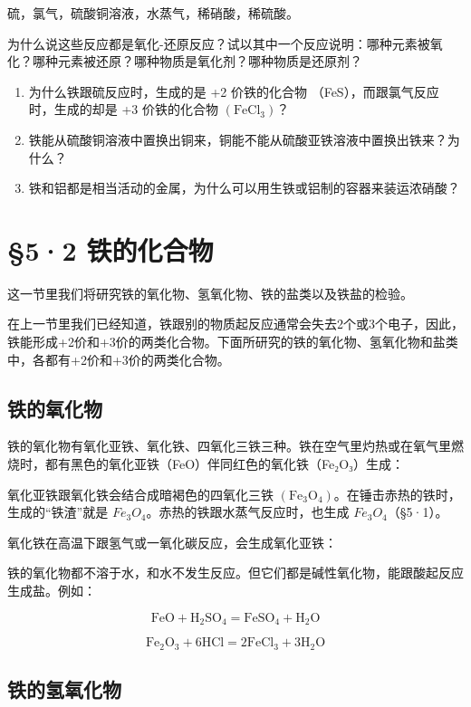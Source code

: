 硫，氯气，硫酸铜溶液，水蒸气，稀硝酸，稀硫酸。

为什么说这些反应都是氧化-还原反应？试以其中一个反应说明：哪种元素被氧化？哪种元素被还原？哪种物质是氧化剂？哪种物质是还原剂？

\begin{enumerate}[start=2]
\item
  为什么铁跟硫反应时，生成的是 +2 价铁的化合物
  （FeS），而跟氯气反应时，生成的却是 +3 价铁的化合物
  \((\mathrm{FeCl}_{3})\)？
\item
  铁能从硫酸铜溶液中置换出铜来，铜能不能从硫酸亚铁溶液中置换出铁来？为什么？
\item
  铁和铝都是相当活动的金属，为什么可以用生铁或铝制的容器来装运浓硝酸？
\end{enumerate}

\section{§5·2 铁的化合物}

这一节里我们将研究铁的氧化物、氢氧化物、铁的盐类以及铁盐的检验。

在上一节里我们已经知道，铁跟别的物质起反应通常会失去2个或3个电子，因此，铁能形成+2价和+3价的两类化合物。下面所研究的铁的氧化物、氢氧化物和盐类中，各都有+2价和+3价的两类化合物。

\subsection{铁的氧化物}

铁的氧化物有氧化亚铁、氧化铁、四氧化三铁三种。铁在空气里灼热或在氧气里燃烧时，都有黑色的氧化亚铁（FeO）伴同红色的氧化铁（Fe₂O₃）生成：

氧化亚铁跟氧化铁会结合成暗褐色的四氧化三铁
\(\left(\mathrm{Fe}_{3}\mathrm{O}_{4}\right)\)。在锤击赤热的铁时，生成的``铁渣''就是
\(Fe_{3}O_{4}\)。赤热的铁跟水蒸气反应时，也生成
\(Fe_{3}O_{4}\)（§5·1）。

氧化铁在高温下跟氢气或一氧化碳反应，会生成氧化亚铁：

铁的氧化物都不溶于水，和水不发生反应。但它们都是碱性氧化物，能跟酸起反应生成盐。例如：

\[
\mathrm{FeO} + \mathrm{H} _ {2} \mathrm{SO} _ {4} = \mathrm{FeSO} _ {4} + \mathrm{H} _ {2} \mathrm{O}
\]

\[
\mathrm{Fe} _ {2} \mathrm{O} _ {3} + 6 \mathrm{HCl} = 2 \mathrm{FeCl} _ {3} + 3 \mathrm{H} _ {2} \mathrm{O}
\]

\subsection{铁的氢氧化物}

